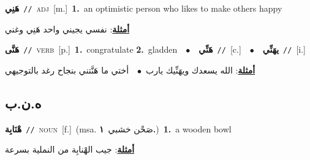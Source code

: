 \documentclass[10pt,a4paper,twoside]{article} %
\begin{document}
\begin{multicols}{2}
{\setlength\topsep{0pt}\textbf{\foreignlanguage{arabic}{هَنِي}}\ {\color{gray}\texttt{//}\color{black}}\ \textsc{adj}\ [m.]\ \textbf{1.}~an optimistic person who likes to make others happy\  \begin{flushright}\color{gray}\foreignlanguage{arabic}{\textbf{\underline{\foreignlanguage{arabic}{أمثلة}}}: نفسي يجيني واحد هَنِي وغني}\end{flushright}\color{black}} \vspace{2mm}

{\setlength\topsep{0pt}\textbf{\foreignlanguage{arabic}{هَنَّى}}\ {\color{gray}\texttt{//}\color{black}}\ \textsc{verb}\ [p.]\ \textbf{1.}~congratulate  \textbf{2.}~gladden\ \ $\bullet$\ \ \setlength\topsep{0pt}\textbf{\foreignlanguage{arabic}{هَنِّي}}\ {\color{gray}\texttt{//}\color{black}}\ [c.]\ \ $\bullet$\ \ \setlength\topsep{0pt}\textbf{\foreignlanguage{arabic}{يهَنِّي}}\ {\color{gray}\texttt{//}\color{black}}\ [i.]\  \begin{flushright}\color{gray}\foreignlanguage{arabic}{\textbf{\underline{\foreignlanguage{arabic}{أمثلة}}}: الله يسعدك ويهَنِّيك يارب\ $\bullet$\ \  أختي ما هَنَّتني بنجاح رغد بالتوجيهي}\end{flushright}\color{black}} \vspace{2mm}

\vspace{-3mm}
\subsection*{\color{blue}\foreignlanguage{arabic}{ه.ن.ب}\color{blue}{}} 

{\setlength\topsep{0pt}\textbf{\foreignlanguage{arabic}{هْنَابِة}}\ {\color{gray}\texttt{//}\color{black}}\ \textsc{noun}\ [f.]\ \color{gray}(msa. \foreignlanguage{arabic}{صَحْن خشبي}~\foreignlanguage{arabic}{\textbf{١.}})\color{black}\ \textbf{1.}~a wooden bowl\  \begin{flushright}\color{gray}\foreignlanguage{arabic}{\textbf{\underline{\foreignlanguage{arabic}{أمثلة}}}: جيب الهْنابِة من النملية بسرعة}\end{flushright}\color{black}} \vspace{2mm}


\end{multicols}
\end{document}
